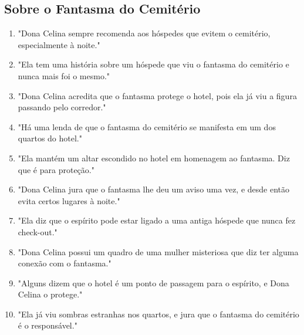 \subsection*{Sobre o Fantasma do Cemitério}
\begin{enumerate}
    \item "Dona Celina sempre recomenda aos hóspedes que evitem o cemitério, especialmente à noite."
    \item "Ela tem uma história sobre um hóspede que viu o fantasma do cemitério e nunca mais foi o mesmo."
    \item "Dona Celina acredita que o fantasma protege o hotel, pois ela já viu a figura passando pelo corredor."
    \item "Há uma lenda de que o fantasma do cemitério se manifesta em um dos quartos do hotel."
    \item "Ela mantém um altar escondido no hotel em homenagem ao fantasma. Diz que é para proteção."
    \item "Dona Celina jura que o fantasma lhe deu um aviso uma vez, e desde então evita certos lugares à noite."
    \item "Ela diz que o espírito pode estar ligado a uma antiga hóspede que nunca fez check-out."
    \item "Dona Celina possui um quadro de uma mulher misteriosa que diz ter alguma conexão com o fantasma."
    \item "Alguns dizem que o hotel é um ponto de passagem para o espírito, e Dona Celina o protege."
    \item "Ela já viu sombras estranhas nos quartos, e jura que o fantasma do cemitério é o responsável."
\end{enumerate}


